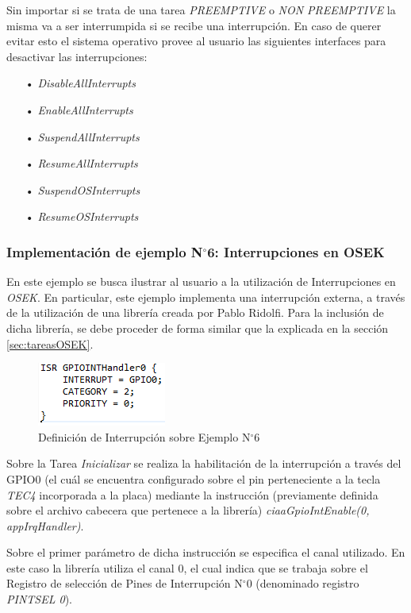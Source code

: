\documentclass[12pt,letterpaper]{article}
\begin{document}
Sin importar si se trata de una tarea \textit{PREEMPTIVE} o \textit{NON PREEMPTIVE} la misma va a ser interrumpida si se recibe una interrupción. En caso de querer evitar esto el sistema operativo provee al usuario las siguientes
interfaces para desactivar las interrupciones:
\begin{enumerate}
\item[•]\textit{DisableAllInterrupts}
\item[•]\textit{EnableAllInterrupts}
\item[•]\textit{SuspendAllInterrupts}
\item[•]\textit{ResumeAllInterrupts}
\item[•]\textit{SuspendOSInterrupts}
\item[•]\textit{ResumeOSInterrupts}
\end{enumerate}

\subsubsection{Implementación de ejemplo N$^{\circ}$6: Interrupciones en OSEK}
En este ejemplo se busca ilustrar al usuario a la utilización de Interrupciones en \textit{OSEK}. En particular, este ejemplo implementa una interrupción externa, a través de la utilización de una librería creada por Pablo Ridolfi\cite{enlacelibreriainterrupcion}. Para la inclusión de dicha librería, se debe proceder de forma similar que la explicada en la sección \ref{sec:tareasOSEK}.

\begin{figure}[!h]
\centering
\includegraphics[width=5 cm]{figuras/f34.png}
\caption{Definición de Interrupción sobre Ejemplo N$^{\circ}$6}
\label{Fig43}
\end{figure}
Sobre la Tarea \textit{Inicializar} se realiza la habilitación de la interrupción a través del GPIO0 (el cuál se encuentra configurado sobre el pin perteneciente a la tecla \textit{TEC4} incorporada a la placa) mediante la instrucción (previamente definida sobre el archivo cabecera que pertenece a la librería) \textit{ciaaGpioIntEnable(0, appIrqHandler)}.

Sobre el primer parámetro de dicha instrucción se especifica el canal utilizado. En este caso la librería utiliza el canal 0, el cual indica que se trabaja sobre el Registro de selección de Pines de Interrupción N$^{\circ}$0 (denominado registro \textit{PINTSEL 0}).
\end{document}
